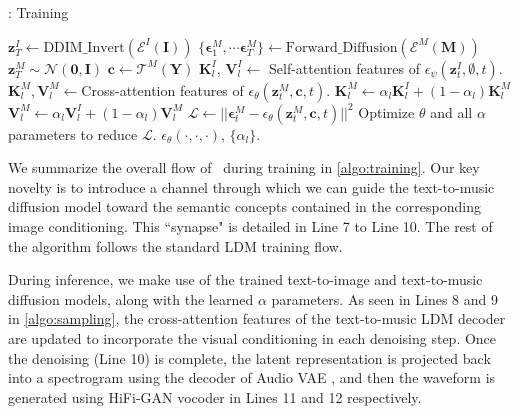 \begin{algorithm}[!t]
\small
\caption{\modelname: Training}
\label{algo:training}
\begin{algorithmic}[1]
\State $\bm{z}^{I}_{T} \leftarrow \text{DDIM\_Invert}(\mathcal{E}^I(\bm{I}))$ 
\State $\{\bm{\epsilon}_1^M, \cdots \bm{\epsilon}_T^M\} \leftarrow \text{Forward\_Diffusion}(\mathcal{E}^M(\bm{M}))$ 
\State $\bm{z}^{M}_{T} \sim \mathcal{N}(\bm{0}, \textbf{I})$ 
\State $\bm{c} \leftarrow \mathcal{T}^M(\bm{Y})$ 
 
\State $\bm{K}^I_l$, $\bm{V}^I_l \leftarrow$ Self-attention features of $\epsilon_\psi(\bm{z}^{I}_{t},\emptyset, t)$.
\State $\bm{K}^M_l,\bm{V}^M_l\leftarrow$Cross-attention features of $\epsilon_\theta(\bm{z}^{M}_{t},\bm{c},t)$.
\State $\bm{K}^M_l \leftarrow \alpha_l \bm{K}^I_l + (1 - \alpha_l) \bm{K}^M_l$  
\State $\bm{V}^M_l \leftarrow \alpha_l \bm{V}^I_l + (1 - \alpha_l) \bm{V}^M_l$  
\EndFor
\State $\mathcal{L} \leftarrow ||\bm{\epsilon}_t^M - \epsilon_\theta(\bm{z}^{M}_{t}, \bm{c}, t)||^2$ 
\State Optimize $\theta$ and all $\alpha$ parameters to reduce $\mathcal{L}$.
\EndFor
\State \Return $\epsilon_\theta(\cdot,\cdot,\cdot)$, $\{\alpha_l\}$.
\end{algorithmic}
\end{algorithm}
We summarize the overall flow of \modelname~during training in \cref{algo:training}. Our key novelty is to introduce a channel through which we can guide the text-to-music diffusion model toward the semantic concepts contained in the corresponding image conditioning. This ``synapse" is detailed in Line 7 to Line 10. The rest of the algorithm follows the standard LDM training flow.

During inference, we make use of the trained text-to-image and text-to-music diffusion models, along with the learned $\alpha$ parameters. As seen in Lines 8 and 9 in \cref{algo:sampling}, the cross-attention features of the text-to-music LDM decoder are updated to incorporate the visual conditioning in each denoising step. Once the denoising (Line 10) is complete, the latent representation is projected back into a spectrogram using the decoder of Audio VAE \cite{audioldm}, and then the waveform is generated using HiFi-GAN vocoder \cite{hifigan} in Lines 11 and 12 respectively.

